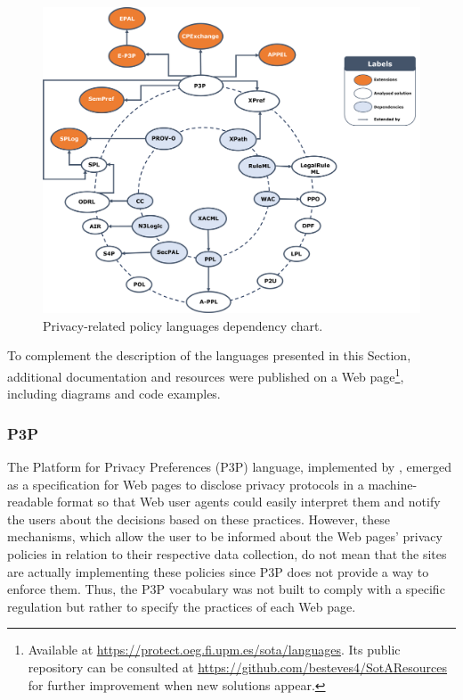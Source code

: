 \begin{figure}
\caption{Privacy-related policy languages dependency chart.}
\label{fig:lang-dependency-graph}
\centering
\includegraphics[width=\textwidth]{figures/chapter-2/languages.png}
\end{figure}

To complement the description of the languages presented in this Section, additional documentation and resources were published on a Web page\footnote{Available at \url{https://protect.oeg.fi.upm.es/sota/languages}. Its public repository can be consulted at \url{https://github.com/besteves4/SotAResources} for further improvement when new solutions appear.}, including diagrams and code examples.


\subsubsection{P3P}
\label{sec:p3p}

The Platform for Privacy Preferences (P3P) language, implemented by \cite{cranor_platform_2002}, emerged as a specification for Web pages to disclose privacy protocols in a machine-readable format so that Web user agents could easily interpret them and notify the users about the decisions based on these practices.
However, these mechanisms, which allow the user to be informed about the Web pages' privacy policies in relation to their respective data collection, do not mean that the sites are actually implementing these policies since P3P does not provide a way to enforce them.
Thus, the P3P vocabulary was not built to comply with a specific regulation but rather to specify the practices of each Web page. 

